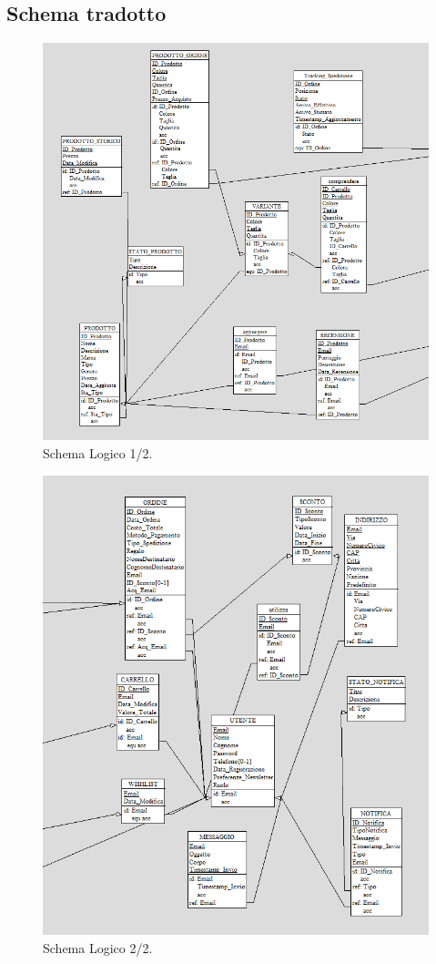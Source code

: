 \documentclass[a4paper,12pt]{report}
\begin{document}
	\subsection{Schema tradotto}
	\begin{figure}[H]
		\centering
		\includegraphics[width=400pt]{ER/Logic/rel_sx.png}
		\caption{Schema Logico 1/2.}
	\end{figure}
	\begin{figure}[H]
		\centering
		\includegraphics[width=400pt]{ER/Logic/rel_dx.png}
		\caption{Schema Logico 2/2.}
	\end{figure}
\end{document}
